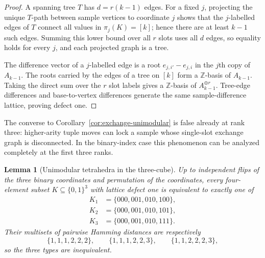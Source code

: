 \documentclass[11pt]{article}
\newtheorem{lemma}[definition]{Lemma}
\begin{document}
\begin{proof}
A spanning tree $T$ has $d=r(k-1)$ edges.  For a fixed $j$, projecting the
unique $T$-path between sample vertices to coordinate $j$ shows that the
$j$-labelled edges of $T$ connect all values in $\pi_j(K)=[k]$; hence there
are at least $k-1$ such edges.  Summing this lower bound over all $r$ slots
uses all $d$ edges, so equality holds for every $j$, and each projected graph
is a tree.

The difference vector of a $j$-labelled edge is a root
$e_{j,i'}-e_{j,i}$ in the $j$th copy of $A_{k-1}$.  The roots carried by the
edges of a tree on $[k]$ form a $\mathbb Z$-basis of $A_{k-1}$.  Taking the
direct sum over the $r$ slot labels gives a $\mathbb Z$-basis of
$A_{k-1}^{\oplus r}$.  Tree-edge differences and base-to-vertex differences
generate the same sample-difference lattice, proving defect one.
\end{proof}

The converse to Corollary~\ref{cor:exchange-unimodular} is false already at
rank three: higher-arity tuple moves can lock a sample whose single-slot
exchange graph is disconnected.  In the binary-index case this phenomenon can
be analyzed completely at the first three ranks.

\begin{lemma}[Unimodular tetrahedra in the three-cube]
\label{lem:cube-unimodular-orbits}
Up to independent flips of the three binary coordinates and permutation of the
coordinates, every four-element subset $K\subseteq\{0,1\}^3$ with lattice
defect one is equivalent to exactly one of
\[
\begin{aligned}
 K_1&=\{000,001,010,100\},\\
 K_2&=\{000,001,010,101\},\\
 K_3&=\{000,001,010,111\}.
\end{aligned}
\]
Their multisets of pairwise Hamming distances are respectively
\[
 \{1,1,1,2,2,2\},\qquad
 \{1,1,1,2,2,3\},\qquad
 \{1,1,2,2,2,3\},
\]
so the three types are inequivalent.
\end{lemma}
\end{document}
